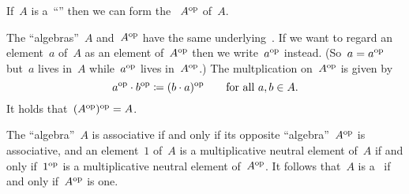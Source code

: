% 
% 


\begin{recall}
  If~$A$ is a~\enquote{\algebra{$\kf$}} then we can form the ~$A^{\mathrm{op}}$ of~$A$.

  The \enquote{algebras}~$A$ and~$A^{\mathrm{op}}$ have the same underlying~\vectorspace{$\kf$}.
  If we want to regard an element~$a$ of~$A$ as an element of~$A^{\mathrm{op}}$ then we write~$a^{\mathrm{op}}$ instead.
  (So~$a = a^{\mathrm{op}}$ but~$a$ lives in~$A$ while~$a^{\mathrm{op}}$ lives in~$A^{\mathrm{op}}$.)
  The multplication on~$A^{\mathrm{op}}$ is given by
  \[
    a^{\mathrm{op}} \cdot b^{\mathrm{op}}
    \coloneqq
    (b \cdot a)^{\mathrm{op}}
    \qquad
    \text{for all~$a, b \in A$.}
  \]
  It holds that~$(A^{\mathrm{op}})^{\mathrm{op}} = A$.

  The \enquote{algebra}~$A$ is associative if and only if its opposite \enquote{algebra}~$A^{\mathrm{op}}$ is associative, and an element~$1$ of~$A$ is a multiplicative neutral element of~$A$ if and only if~$1^{\mathrm{op}}$ is a multiplicative neutral element of~$A^{\mathrm{op}}$.
  It follows that~$A$ is a~{\algebra{$\kf$}} if and only if~$A^{\mathrm{op}}$ is one.
\end{recall}


